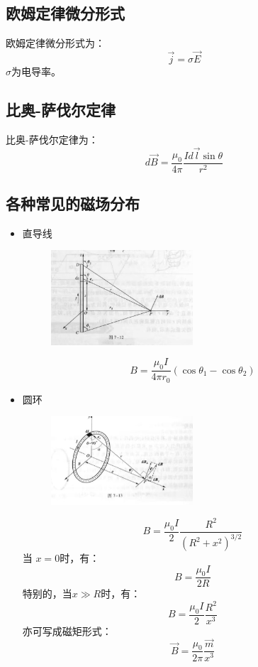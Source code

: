 \documentclass{ctexart}
\begin{document}
\subsection{欧姆定律微分形式}
欧姆定律微分形式为：
$$
    \vec{j} = \sigma \vec{E}
$$
$\sigma$为电导率。
\subsection{比奥-萨伐尔定律}
比奥-萨伐尔定律为：
$$
    d\vec{B} = \frac{\mu_0}{4\pi} \frac{Id\vec{l}\sin\theta}{r^2}
$$
\subsection{各种常见的磁场分布}
\begin{itemize}
    \item 直导线
    \begin{figure}[H]
        \centering
        \includegraphics[width=0.5\textwidth]{img/7-12.jpg}
    \end{figure}
    $$
        B = \frac{\mu_0I}{4\pi r_0} (\cos \theta_1 - \cos \theta_2)
    $$
    \item 圆环
    \begin{figure}[H]
        \centering
        \includegraphics[width=0.5\textwidth]{img/7-13.jpg}
    \end{figure}
    $$
        B = \frac{\mu_0I}{2} \frac{R^2}{(R^2 + x^2)^{3/2}}
    $$
    当 $x = 0$时，有：
    $$
        B = \frac{\mu_0I}{2R}
    $$
    特别的，当$x \gg R$时，有：
    $$
        B = \frac{\mu_0I}{2} \frac{R^2}{x^3}
    $$
    亦可写成磁矩形式：
    $$
        \vec{B} = \frac{\mu_0}{2\pi} \frac{\vec{m} }{x^3}
    $$

\end{itemize}
\end{document}
